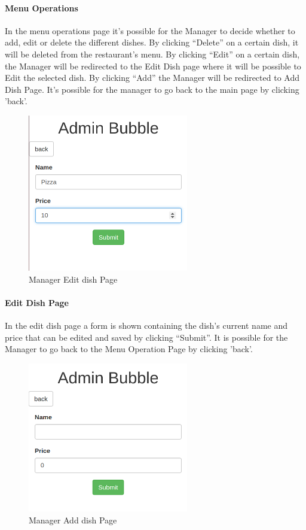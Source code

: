 \paragraph{Menu Operations}
In the menu operations page it's possible for the Manager to decide whether to add, edit or delete the different dishes.
By clicking ``Delete'' on a certain dish, it will be deleted from the restaurant's menu.
By clicking ``Edit'' on a certain dish, the Manager will be redirected to the Edit Dish page where it will be possible to Edit the selected dish.
By clicking ``Add'' the Manager will be redirected to Add Dish Page.
It's possible for the manager to go back to the main page by clicking 'back'.

\begin{figure}[H]
	\centering
	\includegraphics[width=7cm]{../../documenti/UserManualDemo/demo_screens/admin_edit.png}
	\caption{Manager Edit dish Page}
\end{figure}
\paragraph{Edit Dish Page}
In the edit dish page a form is shown containing the dish's current name and price that can be edited and saved by clicking ``Submit''.
It is possible for the Manager to go back to the Menu Operation Page by clicking 'back'.

\begin{figure}[H]
	\centering
	\includegraphics[width=7cm]{../../documenti/UserManualDemo/demo_screens/admin_add.png}
	\caption{Manager Add dish Page}
\end{figure}
